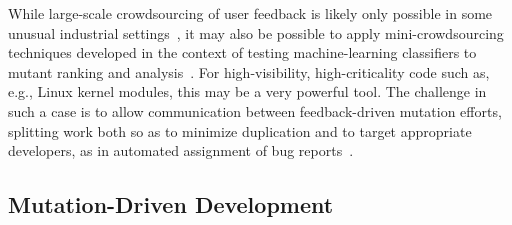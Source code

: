 While large-scale crowdsourcing of user feedback is likely only
possible in some unusual industrial
settings~\cite{MutGoogle,ivankovic2018industrial}, it may also be
possible to apply mini-crowdsourcing techniques developed in the
context of testing machine-learning classifiers to mutant ranking and
analysis~\cite{Minicrowd}.  For high-visibility, high-criticality code
such as, e.g., Linux kernel modules, this may be a very powerful
tool.  The challenge in such a case is to allow communication between
feedback-driven mutation efforts, splitting work both so as to
minimize duplication and to target appropriate developers, as in automated assignment of
bug reports~\cite{bhattacharya2012automated,jonsson2016automated}.


\subsection{Mutation-Driven Development}

